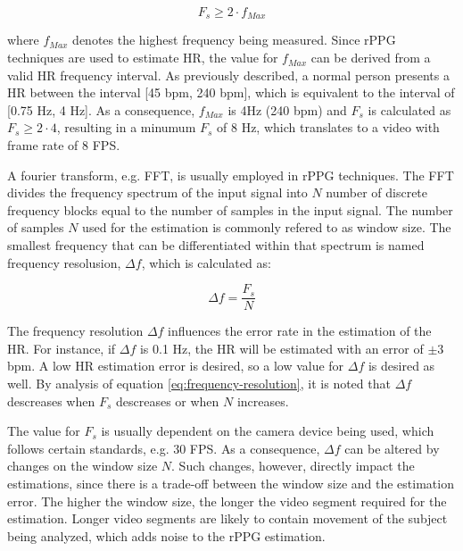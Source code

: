 \begin{equation*}
    F_s \geq 2 \cdot f_{Max}
\end{equation*}

where $f_{Max}$ denotes the highest frequency being measured. Since rPPG techniques are used to estimate HR, the value for $f_{Max}$ can be derived from a valid HR frequency interval. As previously described, a normal person presents a HR between the interval [45 bpm, 240 bpm], which is equivalent to the interval of [0.75 Hz, 4 Hz]. As a consequence, $f_{Max}$ is 4Hz (240 bpm) and $F_s$ is calculated as $F_s \geq 2 \cdot 4$, resulting in a minumum $F_s$ of 8 Hz, which translates to a video with frame rate of 8 FPS.

A fourier transform, e.g. FFT, is usually employed in rPPG techniques. The FFT divides the frequency spectrum of the input signal into $N$ number of discrete frequency blocks equal to the number of samples in the input signal. The number of samples $N$ used for the estimation is commonly refered to as window size. The smallest frequency that can be differentiated within that spectrum is named frequency resolusion, $\Delta f$, which is calculated as:

\begin{equation}
    \Delta f = \frac{F_s}{N}
    \label{eq:frequency-resolution}
\end{equation}

The frequency resolution $\Delta f$ influences the error rate in the estimation of the HR. For instance, if $\Delta f$ is 0.1 Hz, the HR will be estimated with an error of $\pm 3$ bpm. A low HR estimation error is desired, so a low value for $\Delta f$ is desired as well. By analysis of equation \ref{eq:frequency-resolution}, it is noted that $\Delta f$ descreases when $F_s$ descreases or when $N$ increases.

The value for $F_s$ is usually dependent on the camera device being used, which follows certain standards, e.g. 30 FPS. As a consequence, $\Delta f$ can be altered by changes on the window size $N$. Such changes, however, directly impact the estimations, since there is a trade-off between the window size and the estimation error. The higher the window size, the longer the video segment required for the estimation. Longer video segments are likely to contain movement of the subject being analyzed, which adds noise to the rPPG estimation.

